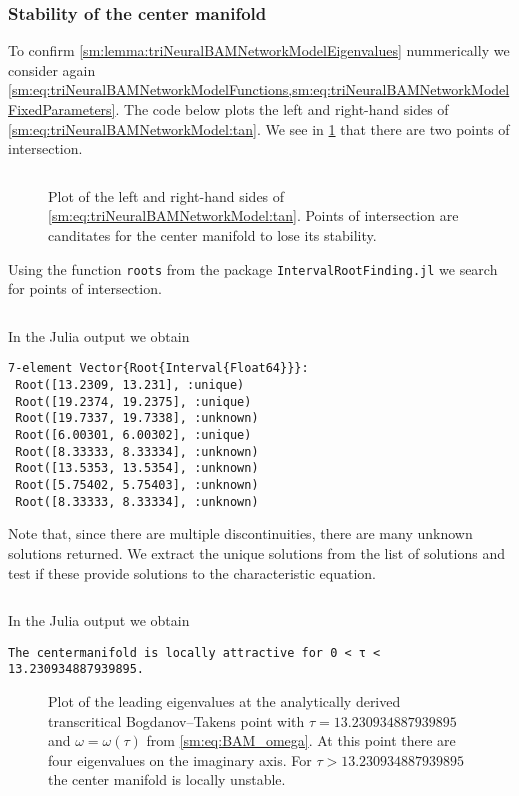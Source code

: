 \subsubsection{Stability of the center manifold}
To confirm \cref{sm:lemma:triNeuralBAMNetworkModelEigenvalues} nummerically we
consider again
\cref{sm:eq:triNeuralBAMNetworkModelFunctions,sm:eq:triNeuralBAMNetworkModelFixedParameters}.
The code below plots the left and right-hand sides of
\cref{sm:eq:triNeuralBAMNetworkModel:tan}. We see in
\cref{sm:fig:triNeuralBAMNetworkStabilityDeterminingFunction} that there are
two points of intersection.
\inputminted[firstline=421, lastline=439]{julia}{\pathToJuliaFiles/triNeuralBAMNetworkModel_simulation_article.jl}
\begin{figure}[ht]
    \centering
    \caption{Plot of the left and right-hand sides of
    \cref{sm:eq:triNeuralBAMNetworkModel:tan}. Points of intersection are
    canditates for the center manifold to lose its stability.}
    \label{sm:fig:triNeuralBAMNetworkStabilityDeterminingFunction}
\end{figure}
Using the function \texttt{roots} from the package {\tt IntervalRootFinding.jl}
we search for points of intersection. 
\inputminted[firstline=441, lastline=444]{julia}{\pathToJuliaFiles/triNeuralBAMNetworkModel_simulation_article.jl}
In the Julia output we obtain
\begin{verbatim}
7-element Vector{Root{Interval{Float64}}}:
 Root([13.2309, 13.231], :unique)
 Root([19.2374, 19.2375], :unique)
 Root([19.7337, 19.7338], :unknown)
 Root([6.00301, 6.00302], :unique)
 Root([8.33333, 8.33334], :unknown)
 Root([13.5353, 13.5354], :unknown)
 Root([5.75402, 5.75403], :unknown)
 Root([8.33333, 8.33334], :unknown)
\end{verbatim}
Note that, since there are multiple discontinuities, there are many unknown
solutions returned. We extract the unique solutions from the list of solutions
and test if these provide solutions to the characteristic equation.
\inputminted[firstline=446, lastline=457]{julia}{\pathToJuliaFiles/triNeuralBAMNetworkModel_simulation_article.jl}
In the Julia output we obtain
\begin{verbatim}
The centermanifold is locally attractive for 0 < τ < 13.230934887939895.
\end{verbatim}

\begin{figure}[ht]
    \centering
    \caption{Plot of the leading eigenvalues at the analytically derived
    transcritical Bogdanov--Takens point with $\tau = 13.230934887939895$
    and $\omega = \omega(\tau)$ from \cref{sm:eq:BAM_omega}. At this
    point there are four eigenvalues on the imaginary axis. For
    $\tau > 13.230934887939895$ the center manifold is locally unstable.}
    \label{sm:fig:triNeuralBAMNetworkModelEigenvalues}
\end{figure}

